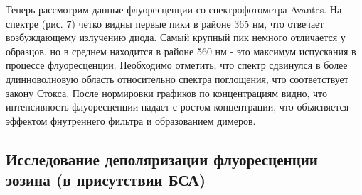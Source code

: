 \documentclass{article}
\begin{document}
\par Теперь рассмотрим данные флуоресценции со спектрофотометра Avantes. На спектре (рис. 7) чётко видны первые пики в районе 365 нм, что отвечает возбуждающему излучению диода. Самый крупный пик немного отличается у образцов, но в среднем находится в районе 560 нм - это максимум испускания в процессе флуоресценции. Необходимо отметить, что спектр сдвинулся в более длинноволновую область относительно спектра поглощения, что соответствует закону Стокса. После нормировки графиков по концентрациям видно, что интенсивность флуоресценции падает с ростом концентрации, что объясняется эффектом фнутреннего фильтра и образованием димеров.
\subsection{Исследование деполяризации флуоресценции эозина (в присутствии БСА)}
\end{document}

